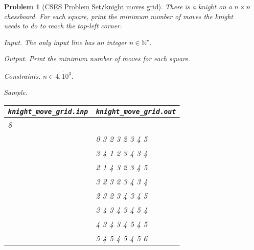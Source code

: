 \documentclass{article}
\newtheorem{problem}{Problem}
\begin{document}
\begin{problem}[\href{https://cses.fi/problemset/task/3217}{CSES Problem Set{\tt/}knight moves grid}]
    There is a knight on a $n\times n$ chessboard. For each square, print the minimum number of moves the knight needs to do to reach the top-left corner.
    \item {\sf Input.} The only input line has an integer $n\in\mathbb{N}^\star$.
    \item {\sf Output.} Print the minimum number of moves for each square.
    \item {\sf Constraints.} $n\in\overline{4,10^3}$.
    \item {\sf Sample.}
    \begin{table}[H]
        \centering
        \begin{tabular}{|l|l|}
            \hline
            \verb|knight_move_grid.inp| & \verb|knight_move_grid.out| \\
            \hline
            8 & \\
            & 0 3 2 3 2 3 4 5 \\
            & 3 4 1 2 3 4 3 4 \\
            & 2 1 4 3 2 3 4 5 \\
            & 3 2 3 2 3 4 3 4 \\
            & 2 3 2 3 4 3 4 5 \\
            & 3 4 3 4 3 4 5 4 \\
            & 4 3 4 3 4 5 4 5 \\
            & 5 4 5 4 5 4 5 6 \\
            \hline
        \end{tabular}
    \end{table}
\end{problem}
\end{document}
